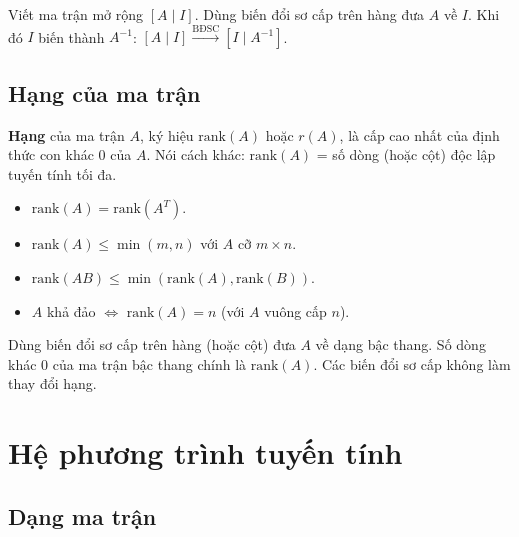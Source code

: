 \documentclass[12pt,a4paper]{article}
\begin{document}
\begin{phuongphap}[title={Tính $A^{-1}$ bằng Gauss-Jordan}]
  Viết ma trận mở rộng $[A \mid I]$. Dùng biến đổi sơ cấp trên hàng đưa $A$ về $I$. Khi đó $I$ biến thành $A^{-1}$: $[A \mid I] \xrightarrow{\text{BĐSC}} [I \mid A^{-1}]$.
\end{phuongphap}

\subsection{Hạng của ma trận}

\begin{dinhnghia}
  \textbf{Hạng} của ma trận $A$, ký hiệu $\mathrm{rank}(A)$ hoặc $r(A)$, là cấp cao nhất của định thức con khác 0 của $A$. Nói cách khác: $\mathrm{rank}(A)$ = số dòng (hoặc cột) độc lập tuyến tính tối đa.
\end{dinhnghia}

\begin{tinhchat}[title={Tính chất hạng}]
  \begin{itemize}
    \item $\mathrm{rank}(A) = \mathrm{rank}(A^T)$.
    \item $\mathrm{rank}(A) \le \min(m, n)$ với $A$ cỡ $m \times n$.
    \item $\mathrm{rank}(AB) \le \min(\mathrm{rank}(A), \mathrm{rank}(B))$.
    \item $A$ khả đảo $\Leftrightarrow$ $\mathrm{rank}(A) = n$ (với $A$ vuông cấp $n$).
  \end{itemize}
\end{tinhchat}

\begin{phuongphap}[title={Tính hạng bằng biến đổi sơ cấp}]
  Dùng biến đổi sơ cấp trên hàng (hoặc cột) đưa $A$ về dạng bậc thang. Số dòng khác 0 của ma trận bậc thang chính là $\mathrm{rank}(A)$. Các biến đổi sơ cấp không làm thay đổi hạng.
\end{phuongphap}

\section{Hệ phương trình tuyến tính}

\subsection{Dạng ma trận}
\end{document}
